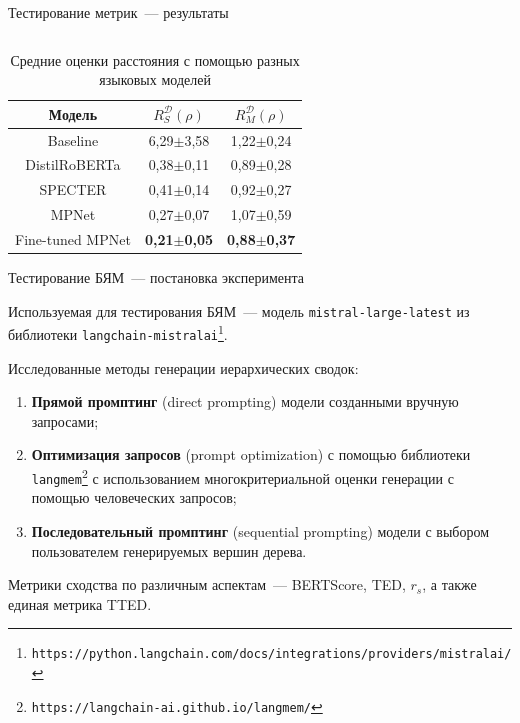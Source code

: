 \documentclass{beamer}
\begin{document}
\begin{frame}{Тестирование метрик~--- результаты}
\begin{columns}
\end{columns}

\begin{table}[h]
    \centering
    \begin{tabular}{c|c|c}
        Модель & $R_S^\mathcal{D}(\rho)$ & $R_M^\mathcal{D}(\rho)$ \\ \hline
        Baseline & 6,29$\pm$3,58 & 1,22$\pm$0,24 \\ \hline
        DistilRoBERTa & 0,38$\pm$0,11 & 0,89$\pm$0,28 \\ \hline
        SPECTER & 0,41$\pm$0,14 & 0,92$\pm$0,27 \\ \hline
        MPNet & 0,27$\pm$0,07 & 1,07$\pm$0,59 \\ \hline
        Fine-tuned MPNet & \textbf{0,21$\pm$0,05} & \textbf{0,88$\pm$0,37}
    \end{tabular}
    \caption{Средние оценки расстояния с помощью разных языковых моделей}
    \label{tab:model_results}
\end{table}

\end{frame}


\begin{frame}{Тестирование БЯМ~--- постановка эксперимента}

Используемая для тестирования БЯМ~--- модель \texttt{mistral-large-latest} из библиотеки \texttt{langchain-mistralai}\footnote{\texttt{https://python.langchain.com/docs/integrations/providers/mistralai/}}.

Исследованные методы генерации иерархических сводок:
\begin{enumerate}
    \item \textbf{Прямой промптинг} (direct prompting) модели созданными вручную запросами;
    \item \textbf{Оптимизация запросов} (prompt optimization) с помощью библиотеки \texttt{langmem}\footnote{\texttt{https://langchain-ai.github.io/langmem/}} с использованием многокритериальной оценки генерации с помощью человеческих запросов;
    \item \textbf{Последовательный промптинг} (sequential prompting) модели с выбором пользователем генерируемых вершин дерева.
\end{enumerate}
Метрики сходства по различным аспектам~--- BERTScore, TED, $r_s$, а также единая метрика TTED. 

\end{frame}
\end{document}
